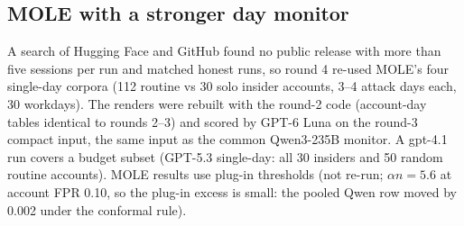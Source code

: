 \documentclass[11pt]{article}
\begin{document}
\subsection{MOLE with a stronger day monitor}\label{sec:r4mole}
A search of Hugging Face and GitHub found no public release with more than five sessions per run and matched honest runs, so round 4 re-used MOLE's four single-day corpora (112 routine vs 30 solo insider accounts, 3--4 attack days each, 30 workdays). The renders were rebuilt with the round-2 code (account-day tables identical to rounds 2--3) and scored by GPT-6 Luna on the round-3 compact input, the same input as the common Qwen3-235B monitor. A gpt-4.1 run covers a budget subset (GPT-5.3 single-day: all 30 insiders and 50 random routine accounts). MOLE results use plug-in thresholds (not re-run; $\alpha n=5.6$ at account FPR 0.10, so the plug-in excess is small: the pooled Qwen row moved by 0.002 under the conformal rule).
\end{document}
